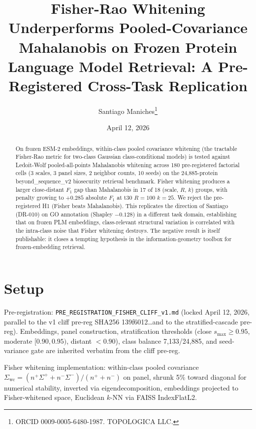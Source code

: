 \documentclass[11pt]{article}
\title{Fisher-Rao Whitening Underperforms Pooled-Covariance Mahalanobis on Frozen Protein Language Model Retrieval: A Pre-Registered Cross-Task Replication}
\author{Santiago Maniches\thanks{ORCID 0009-0005-6480-1987. TOPOLOGICA LLC.}}
\date{April 12, 2026}
\begin{document}
\maketitle
\begin{abstract}
On frozen ESM-2 embeddings, within-class pooled covariance whitening (the tractable Fisher-Rao metric for two-class Gaussian class-conditional models) is tested against Ledoit-Wolf pooled-all-points Mahalanobis whitening across 180 pre-registered factorial cells (3 scales, 3 panel sizes, 2 neighbor counts, 10 seeds) on the 24{,}885-protein beyond\_sequence\_v2 biosecurity retrieval benchmark. Fisher whitening produces a larger close-distant $F_1$ gap than Mahalanobis in 17 of 18 (scale, $R$, $k$) groups, with penalty growing to $+0.285$ absolute $F_1$ at t30 $R{=}100$ $k{=}25$. We reject the pre-registered H1 (Fisher beats Mahalanobis). This replicates the direction of Santiago (DR-010) on GO annotation (Shapley $-0.128$) in a different task domain, establishing that on frozen PLM embeddings, class-relevant structural variation is correlated with the intra-class noise that Fisher whitening destroys. The negative result is itself publishable: it closes a tempting hypothesis in the information-geometry toolbox for frozen-embedding retrieval.
\end{abstract}

\section{Setup}
Pre-registration: \texttt{PRE\_REGISTRATION\_FISHER\_CLIFF\_v1.md} (locked April 12, 2026, parallel to the v1 cliff pre-reg SHA256 139f6012\ldots and to the stratified-cascade pre-reg). Embeddings, panel construction, stratification thresholds (close $s_{\max} \ge 0.95$, moderate $[0.90, 0.95)$, distant $< 0.90$), class balance 7{,}133/24{,}885, and seed-variance gate are inherited verbatim from the cliff pre-reg.

Fisher whitening implementation: within-class pooled covariance $\Sigma_{\text{wc}} = (n^+ \Sigma^+ + n^- \Sigma^-)/(n^++n^-)$ on panel, shrunk 5\% toward diagonal for numerical stability, inverted via eigendecomposition, embeddings projected to Fisher-whitened space, Euclidean $k$-NN via FAISS IndexFlatL2.
\end{document}
